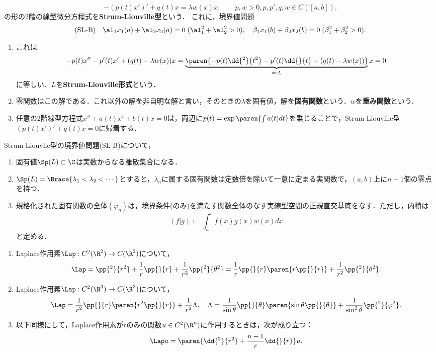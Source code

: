 \documentclass[uplatex,dvipdfmx]{jsreport}
\begin{document}
\begin{problem}
    \[-(p(t)x')'+q(t)x=\lambda w(x)x,\qquad p,w>0,p,p',q,w\in C([a,b]).\]
    の形の2階の線型微分方程式を\textbf{Strum-Liouville型}という．
    これに，境界値問題
    \[\text{(SL-B)}\quad \al_1x_1(a)+\al_2x_2(a)=0\;(\al_1^2+\al_2^2>0),\quad\beta_1x_1(b)+\beta_2x_2(b)=0\;(\beta_1^2+\beta_2^2>0).\]
    \begin{enumerate}
        \item これは
        \[-p(t)x''-p'(t)x'+(q(t)-\lambda w(x))x=\underbrace{\paren{-p(t)\dd{^2}{t^2}-p'(t)\dd{}{t}+(q(t)-\lambda w(x))}}_{=:L}x=0\]
        に等しい．$L$を\textbf{Strum-Liouville形式}という．
        \item 零関数はこの解である．これ以外の解を非自明な解と言い，そのときの$\lambda$を固有値，解を\textbf{固有関数}という．$w$を\textbf{重み関数}という．
        \item 任意の2階線型方程式$x''+a(t)x'+b(t)x=0$は，両辺に$p(t)=\exp\paren{\int a(t)dt}$を乗じることで，Strum-Liouville型$(p(t)x')'+q(t)x=0$に帰着する．
    \end{enumerate}
\end{problem}

\begin{theorem}
    Strum-Liouvlle型の境界値問題(SL-B)について，
    \begin{enumerate}
        \item 固有値$\Sp(L)\subset\C$は実数からなる離散集合になる．
        \item $\Sp(L)=\Brace{\lambda_1<\lambda_2<\cdots}$とすると，$\lambda_n$に属する固有関数は定数倍を除いて一意に定まる実関数で，$(a,b)$上に$n-1$個の零点を持つ．
        \item 規格化された固有関数の全体$(\varphi_n)$は，境界条件(のみ)を満たす関数全体のなす実線型空間の正規直交基底をなす．ただし，内積は
        \[(f|g):=\int^b_af(x)g(x)w(x)dx\]
        と定める．
    \end{enumerate}
\end{theorem}

\begin{example}[Laplace作用素の極表示]\mbox{}
    \begin{enumerate}
        \item Laplace作用素$\Lap:C^2(\R^2)\to C(\R^2)$について，
        \[\Lap=\pp{^2}{r^2}+\frac{1}{r}\pp{}{r}+\frac{1}{r^2}\pp{^2}{\theta^2}=\frac{1}{r}\pp{}{r}\paren{r\pp{}{r}}+\frac{1}{r^2}\pp{^2}{\theta^2}.\]
        \item Laplace作用素$\Lap:C^2(\R^3)\to C(\R^3)$について，
        \[\Lap=\frac{1}{r^2}\pp{}{r}\paren{r^2\pp{}{r}}+\frac{1}{r^2}\Lambda,\quad\Lambda=\frac{1}{\sin\theta}\pp{}{\theta}\paren{\sin\theta\pp{}{\theta}}+\frac{1}{\sin^2\theta}\pp{^2}{\varphi^2}.\]
        \item 以下同様にして，Laplace作用素が$r$のみの関数$u\in C^2(\R^n)$に作用するときは，次が成り立つ：
        \[\Lap u=\paren{\dd{^2}{r^2}+\frac{n-1}{r}\dd{}{r}}u.\]
    \end{enumerate}
\end{example}
\end{document}
